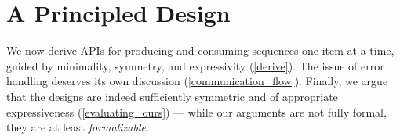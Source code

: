 \documentclass[sigplan,screen,10pt,review]{acmart}
\begin{document}





\section{A Principled Design}\label{main_design}

We now derive APIs for producing and consuming sequences one item at a time, guided by minimality, symmetry, and expressivity (\cref{derive}). The issue of error handling deserves its own discussion (\cref{communication_flow}). Finally, we argue that the designs are indeed sufficiently symmetric and of appropriate expressiveness (\cref{evaluating_ours}) --- while our arguments are not fully formal, they are at least \textit{formalizable}.
\end{document}
